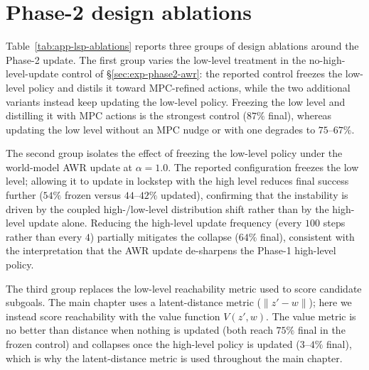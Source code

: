\section{Phase-2 design ablations}
\label{app:lsp-design}

Table~\ref{tab:app-lsp-ablations} reports three groups of design
ablations around the Phase-2 update. The first group varies the
low-level treatment in the no-high-level-update control of
\S\ref{sec:exp-phase2-awr}: the reported control freezes the low-level
policy and distils it toward MPC-refined actions, while the two
additional variants instead keep updating the low-level policy. Freezing
the low level and distilling it with MPC actions is the strongest
control ($87\%$ final), whereas updating the low level without an MPC
nudge or with one degrades to $75$--$67\%$.

The second group isolates the effect of freezing the low-level policy
under the world-model AWR update at $\alpha=1.0$. The reported
configuration freezes the low level; allowing it to update in lockstep
with the high level reduces final success further ($54\%$ frozen versus
$44$--$42\%$ updated), confirming that the instability is driven by the
coupled high-/low-level distribution shift rather than by the high-level
update alone. Reducing the high-level update frequency (every $100$
steps rather than every $4$) partially mitigates the collapse
($64\%$ final), consistent with the interpretation that the AWR update
de-sharpens the Phase-1 high-level policy.

The third group replaces the low-level reachability metric used to score
candidate subgoals. The main chapter uses a latent-distance metric
($\lVert z' - w\rVert$); here we instead score reachability with the
value function $V(z',w)$. The value metric is no better than distance
when nothing is updated (both reach $75\%$ final in the frozen control)
and collapses once the high-level policy is updated ($3$--$4\%$ final),
which is why the latent-distance metric is used throughout the main
chapter.

